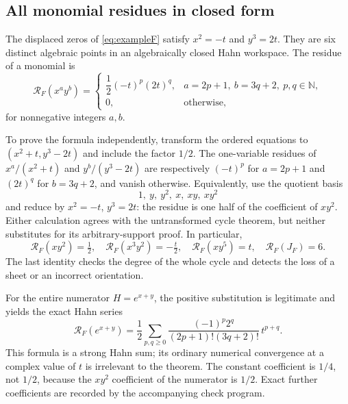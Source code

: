 \documentclass[11pt,letterpaper]{article}
\theoremstyle{definition}
\theoremstyle{remark}
\newcommand{\N}{\mathbb N}\newcommand{\Z}{\mathbb Z}\newcommand{\Q}{\mathbb Q}
\numberwithin{equation}{section}
\begin{document}
\subsection{All monomial residues in closed form}
The displaced zeros of \eqref{eq:exampleF} satisfy
$x^2=-t$ and $y^3=2t$. They are six distinct algebraic points in an
algebraically closed Hahn workspace. The residue of a monomial is
\begin{equation}\label{eq:monomials}
 \boxed{\quad
 \mathcal R_F(x^a y^b)=
 \begin{cases}
 \dfrac12(-t)^p(2t)^q,& a=2p+1,\ b=3q+2,\ p,q\in\N,\\[2pt]
 0,&\text{otherwise},
 \end{cases}\quad}
\end{equation}
for nonnegative integers $a,b$.

To prove the formula independently, transform the ordered equations to
$(x^2+t,y^3-2t)$ and include the factor $1/2$. The one-variable residues
of $x^a/(x^2+t)$ and $y^b/(y^3-2t)$ are respectively $(-t)^p$ for
$a=2p+1$ and $(2t)^q$ for $b=3q+2$, and vanish otherwise. Equivalently,
use the quotient basis
\[
 1,\ y,\ y^2,\ x,\ xy,\ xy^2
\]
and reduce by $x^2=-t$, $y^3=2t$: the residue is one half of the
coefficient of $xy^2$. Either calculation agrees with the untransformed
cycle theorem, but neither substitutes for its arbitrary-support proof.
In particular,
\[
 \mathcal R_F(xy^2)=\tfrac12,\quad
 \mathcal R_F(x^3y^2)=-\tfrac t2,\quad
 \mathcal R_F(xy^5)=t,\quad
 \mathcal R_F(J_F)=6.
\]
The last identity checks the degree of the whole cycle and detects the loss
of a sheet or an incorrect orientation.

For the entire numerator $H=e^{x+y}$, the positive substitution is legitimate
and yields the exact Hahn series
\begin{equation}\label{eq:expresidue}
 \mathcal R_F(e^{x+y})=
 \frac12\sum_{p,q\geq0}
 \frac{(-1)^p2^q}{(2p+1)!(3q+2)!}\,t^{p+q}.
\end{equation}
This formula is a strong Hahn sum; its ordinary numerical convergence at a
complex value of $t$ is irrelevant to the theorem. The constant coefficient
is $1/4$, not $1/2$, because the $xy^2$ coefficient of the numerator is
$1/2$. Exact further coefficients are recorded by the accompanying check
program.
\end{document}
